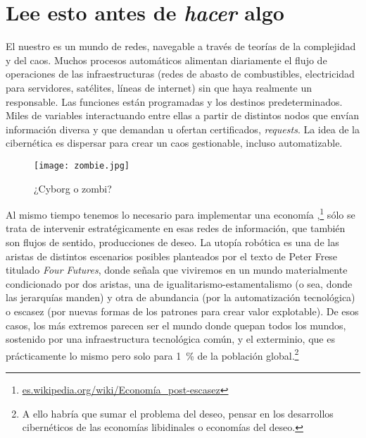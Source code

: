 \chapter{Lee esto antes de \emph{hacer} algo}
\label{cha:antesalgo}

El nuestro es un mundo de redes, navegable a través de teorías de la complejidad y del caos. Muchos procesos automáticos alimentan diariamente el flujo de operaciones de las infraestructuras (redes de abasto de combustibles, electricidad para servidores, satélites, líneas de internet) sin que haya realmente un responsable. Las funciones están programadas y los destinos predeterminados. Miles de variables interactuando entre ellas a partir de distintos nodos que envían información diversa y que demandan u ofertan certificados, \emph{requests}. La idea de la cibernética es dispersar para crear un caos gestionable, incluso automatizable.

\begin{figure}[htbp]
	\centering
	\texttt{[image: zombie.jpg]}
	\caption{¿Cyborg o zombi?}
	\label{fig:cyberzombie}
\end{figure}

Al mismo tiempo tenemos lo necesario para implementar una economía ,\footnote{\url{es.wikipedia.org/wiki/Economía\_post-escasez}} sólo se trata de intervenir estratégicamente en esas redes de información, que también son flujos de sentido, producciones de deseo. La utopía robótica es una de las aristas de distintos escenarios posibles planteados por el texto de Peter Frese titulado \emph{Four Futures}, donde señala que viviremos en un mundo materialmente condicionado por dos aristas, una de igualitarismo-estamentalismo (o sea, donde las jerarquías manden) y otra de abundancia (por la automatización tecnológica) o escasez (por nuevas formas de los patrones para crear valor explotable). De esos casos, los más extremos parecen ser el mundo donde quepan todos los mundos, sostenido por una infraestructura tecnológica común, y el exterminio, que es prácticamente lo mismo pero solo para 1~\% de la población global.\footnote{A ello habría que sumar el problema del deseo, pensar en los desarrollos cibernéticos de las economías libidinales o economías del deseo.}

